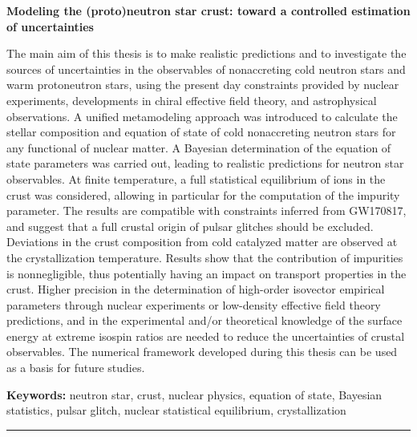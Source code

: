 \newpage
\thispagestyle{empty} %
\mbox{}

\clearpage
\thispagestyle{empty} %
\newpage
\enlargethispage{2\baselineskip}

\vspace*{-6\baselineskip}
\begin{changemargin}{-0.2cm}{-1.2cm} 
\noindent
\begin{center}
\textbf{Modeling the (proto)neutron star crust: toward a controlled estimation
of uncertainties}
\end{center}

The main aim of this thesis is to make realistic predictions and to
investigate the sources of uncertainties in the observables of nonaccreting
cold neutron stars and warm protoneutron stars, using the present day 
constraints provided by nuclear experiments, developments in chiral 
effective field theory, and astrophysical observations.
A unified metamodeling approach was introduced to calculate the stellar 
composition and equation of state of cold nonaccreting neutron stars for any 
functional of nuclear matter.
A Bayesian determination of the equation of state parameters was carried out,
leading to realistic predictions for neutron star observables.
At finite temperature, a full statistical equilibrium of ions in the crust was 
considered, allowing in particular for the computation of the impurity 
parameter.
The results are compatible with constraints inferred from GW170817, and
suggest that a full crustal origin of pulsar glitches should be excluded. 
Deviations in the crust composition from cold catalyzed matter are 
observed at the crystallization temperature. 
Results show that the contribution of impurities is nonnegligible, 
thus potentially having an impact on transport properties in the crust.
Higher precision in the determination of high-order isovector
empirical parameters through nuclear experiments or low-density effective field 
theory predictions, and in the experimental and/or theoretical knowledge of the 
surface energy at extreme isospin ratios are needed to reduce the uncertainties 
of crustal observables. 
The numerical framework developed during this thesis can be used as a basis for 
future studies.

\noindent
\textbf{Keywords:} 
neutron star, crust, nuclear physics, equation of state, Bayesian statistics, 
pulsar glitch, nuclear statistical equilibrium, crystallization 

\begin{center}
  \noindent\rule[0.5ex]{0.8\linewidth}{1pt}
\end{center}


\end{changemargin}
